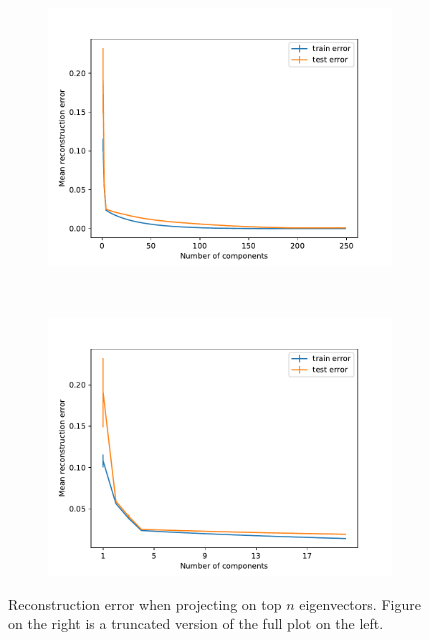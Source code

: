 \documentclass[11pt]{amsart}
\begin{document}
\begin{figure}[h]
\centering
\begin{subfigure}{0.5\textwidth}
\includegraphics[width=\textwidth]{reconstruction.pdf}
\caption{}
\label{subfig:rfam_count}
\end{subfigure}
~
\begin{subfigure}{0.46\textwidth}
\includegraphics[width=\textwidth]{reconstruction_cut.pdf}
\caption{}
\label{subfig:rfam_stats}
\end{subfigure}

\caption{Reconstruction error when projecting on top $n$ eigenvectors. Figure on the right is a truncated version of the full plot on the left.}
\label{fig:reconstruction}
\end{figure}
\end{document}
